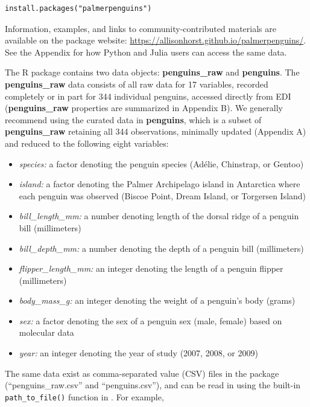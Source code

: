 \begin{verbatim}
install.packages("palmerpenguins")
\end{verbatim}

Information, examples, and links to community-contributed materials are
available on the  package website:
\url{https://allisonhorst.github.io/palmerpenguins/}. See the Appendix
for how Python and Julia users can access the same data.

The  R package contains two data objects:
\textbf{penguins\_raw} and \textbf{penguins}. The \textbf{penguins\_raw}
data consists of all raw data for 17 variables, recorded completely or
in part for 344 individual penguins, accessed directly from EDI
(\textbf{penguins\_raw} properties are summarized in Appendix B). We
generally recommend using the curated data in \textbf{penguins}, which
is a subset of \textbf{penguins\_raw} retaining all 344 observations,
minimally updated (Appendix A) and reduced to the following eight
variables:

\begin{itemize}
\tightlist
\item
  \emph{species:} a factor denoting the penguin species (Adélie,
  Chinstrap, or Gentoo)
\item
  \emph{island:} a factor denoting the Palmer Archipelago island in
  Antarctica where each penguin was observed (Biscoe Point, Dream
  Island, or Torgersen Island)
\item
  \emph{bill\_length\_mm:} a number denoting length of the dorsal ridge
  of a penguin bill (millimeters)
\item
  \emph{bill\_depth\_mm:} a number denoting the depth of a penguin bill
  (millimeters)
\item
  \emph{flipper\_length\_mm:} an integer denoting the length of a
  penguin flipper (millimeters)
\item
  \emph{body\_mass\_g:} an integer denoting the weight of a penguin's
  body (grams)
\item
  \emph{sex:} a factor denoting the sex of a penguin sex (male, female)
  based on molecular data
\item
  \emph{year:} an integer denoting the year of study (2007, 2008, or
  2009)
\end{itemize}

\newpage

The same data exist as comma-separated value (CSV) files in the package
(``penguins\_raw.csv'' and ``penguins.csv''), and can be read in using
the built-in \texttt{path\_to\_file()} function in
. For example,

